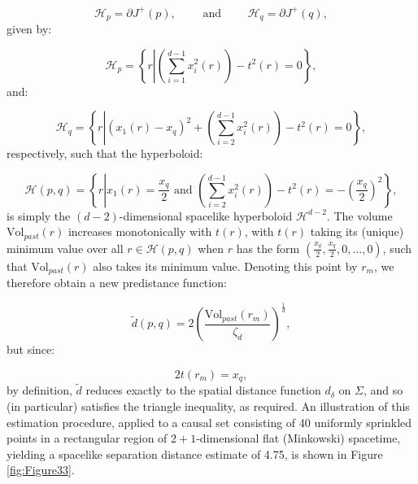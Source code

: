 \documentclass{article}
\begin{document}
\begin{equation}
\mathcal{H}_p = \partial J^{+} \left( p \right), \qquad \text{ and } \qquad \mathcal{H}_q = \partial J^{+} \left( q \right),
\end{equation}
given by:

\begin{equation}
\mathcal{H}_p = \left\lbrace r \left| \left( \sum_{i = 1}^{d - 1} x_{i}^{2} \left( r \right) \right) - t^2 \left( r \right) = 0 \right. \right\rbrace,
\end{equation}
and:

\begin{equation}
\mathcal{H}_q = \left\lbrace r \left| \left( x_1 \left( r \right) - x_q \right)^2 + \left( \sum_{i = 2}^{d - 1} x_{i}^{2} \left( r \right) \right) - t^2 \left( r \right) = 0 \right. \right\rbrace,
\end{equation}
respectively, such that the hyperboloid:

\begin{equation}
\mathcal{H} \left( p, q \right) = \left\lbrace r \left| x_1 \left( r \right) = \frac{x_q}{2} \text{ and } \left( \sum_{i = 2}^{d- 1} x_{i}^{2} \left( r \right) \right) - t^2 \left( r \right) = - \left( \frac{x_q}{2} \right)^2 \right. \right\rbrace,
\end{equation}
is simply the ${\left( d - 2 \right)}$-dimensional spacelike hyperboloid ${\mathcal{H}^{d - 2}}$. The volume ${\mathrm{Vol}_{past} \left( r \right)}$ increases monotonically with ${t \left( r \right)}$, with ${t \left( r \right)}$ taking its (unique) minimum value over all ${r \in \mathcal{H} \left( p, q \right)}$ when $r$ has the form ${\left( \frac{x_q}{2}, \frac{x_q}{2},0, \dots, 0 \right)}$, such that ${\mathrm{Vol}_{past} \left( r \right)}$ also takes its minimum value. Denoting this point by ${r_m}$, we therefore obtain a new predistance function:

\begin{equation}
\tilde{d} \left( p, q \right) = 2 \left( \frac{\mathrm{Vol}_{past} \left( r_m \right)}{\zeta_d} \right)^{\frac{1}{d}},
\end{equation}
but since:

\begin{equation}
2 t \left( r_m \right) = x_q,
\end{equation}
by definition, ${\tilde{d}}$ reduces exactly to the spatial distance function ${d_{\delta}}$ on ${\Sigma}$, and so (in particular) satisfies the triangle inequality, as required. An illustration of this estimation procedure, applied to a causal set consisting of 40 uniformly sprinkled points in a rectangular region of ${2 + 1}$-dimensional flat (Minkowski) spacetime, yielding a spacelike separation distance estimate of 4.75, is shown in Figure \ref{fig:Figure33}.
\end{document}
